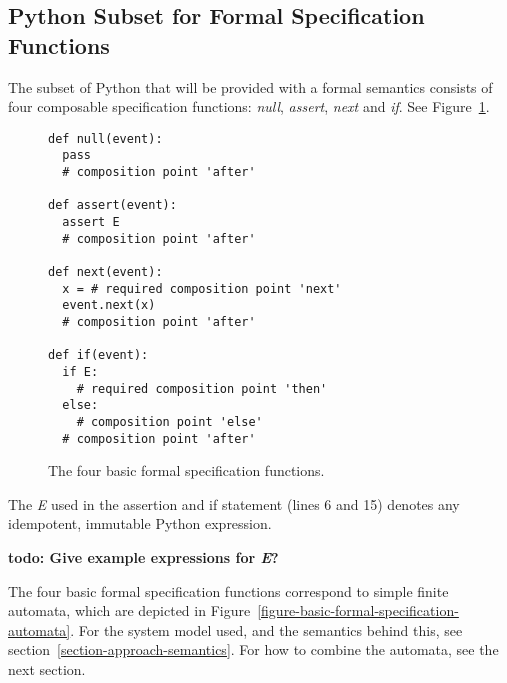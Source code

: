 \documentclass[a4paper,11pt]{kth-mag}
\newcommand{\todo}[1]{\textbf{todo: #1}}
\begin{document}
\subsection{Python Subset for Formal Specification Functions}
\label{section-approach-python-subset}
\lstset{language=Python,numbers=left}

The subset of Python that will be provided with a formal semantics consists of
four composable specification functions: \textit{null}, \textit{assert},
\textit{next} and \textit{if}. See
Figure~\ref{figure-basic-formal-specification-functions}.

\begin{figure}[h!]
	\begin{center}
	\begin{minipage}{0.7\textwidth}
	\begin{lstlisting}
def null(event):
  pass
  # composition point 'after'

def assert(event):
  assert E
  # composition point 'after'

def next(event):
  x = # required composition point 'next'
  event.next(x)
  # composition point 'after'

def if(event):
  if E:
    # required composition point 'then'
  else:
    # composition point 'else'
  # composition point 'after'
	\end{lstlisting}
	\end{minipage}
	\end{center}

	\caption{The four basic formal specification functions.}
	\label{figure-basic-formal-specification-functions}
\end{figure}

The \textit{E} used in the assertion and if statement (lines 6 and 15) denotes
any idempotent, immutable Python expression.

\todo{Give example expressions for \textit{E}?}

The four basic formal specification functions correspond to simple finite
automata, which are depicted in
Figure~\ref{figure-basic-formal-specification-automata}. For the system model
used, and the semantics behind this, see
section~\ref{section-approach-semantics}. For how to combine the automata, see
the next section.
\end{document}
